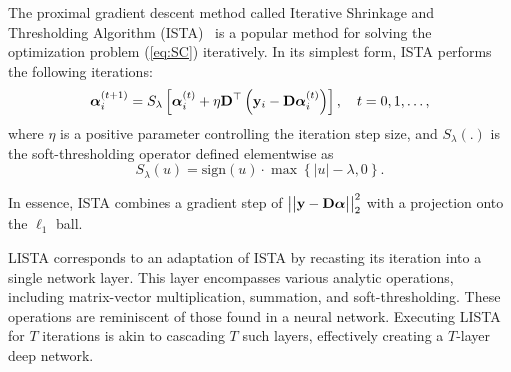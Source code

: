 

The proximal gradient descent method called Iterative Shrinkage and Thresholding Algorithm (ISTA)~\cite{figueiredo_em_2003, daubechies_iterative_2004} is a popular method for solving the optimization problem (\ref{eq:SC}) iteratively.
In its simplest form, ISTA performs the following iterations:
\begin{equation}
\label{eq:ISTA}
    \boldsymbol \alpha_i^{(t+1)} = S_{\lambda}\left[\boldsymbol \alpha_i^{(t)} + \eta \mathbf D^{\top}\left(\mathbf y_i - \mathbf D \boldsymbol \alpha_i^{(t)} \right)\right], \quad t=0,1,\ldots,
\end{equation}
where $\eta$ is a positive parameter controlling the iteration step size, and $S_{\lambda}(.)$ is the soft-thresholding operator defined elementwise as
\begin{equation}
\label{eq:soft-thresholding}
    S_{\lambda}(u) = \text{sign}(u) \cdot \max\left\{|u| - \lambda, 0\right\}.
\end{equation}

In essence, ISTA combines a gradient step of $\big|\big| \mathbf y - \mathbf D \boldsymbol \alpha \big|\big|_2^2$ with a projection onto the $\ell_1$ ball.

LISTA corresponds to an adaptation of ISTA by recasting its iteration into a single network layer.
This layer encompasses various analytic operations, including matrix-vector multiplication, summation, and soft-thresholding.
These operations are reminiscent of those found in a neural network.
Executing LISTA for $T$ iterations is akin to cascading $T$ such layers, effectively creating a $T$-layer deep network.

